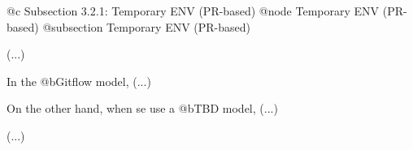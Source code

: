 @c Subsection 3.2.1: Temporary ENV (PR-based)
@node Temporary ENV (PR-based)
@subsection Temporary ENV (PR-based)

(...)

In the @b{Gitflow} model, (...)

On the other hand, when se use a @b{TBD} model, (...)

(...)
